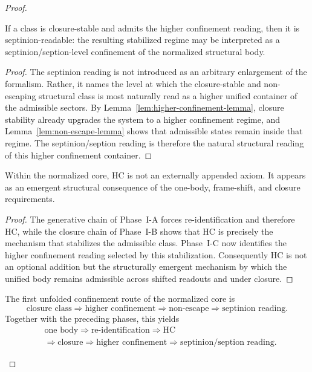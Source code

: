 \begin{proof}
\begin{theorem}
\label{thm:septinion-readability-theorem}
If a class is closure-stable and admits the higher confinement reading, then it
is septinion-readable: the resulting stabilized regime may be interpreted as a
septinion/seption-level confinement of the normalized structural body.
\end{theorem}

\begin{proof}
The septinion reading is not introduced as an arbitrary enlargement of the
formalism. Rather, it names the level at which the closure-stable and
non-escaping structural class is most naturally read as a higher unified
container of the admissible sectors. By Lemma~\ref{lem:higher-confinement-lemma},
closure stability already upgrades the system to a higher confinement regime,
and Lemma~\ref{lem:non-escape-lemma} shows that admissible states remain inside
that regime. The septinion/seption reading is therefore the natural structural
reading of this higher confinement container.
\end{proof}

\begin{corollary}
\label{cor:hc-emergent-structural-consequence}
Within the normalized core, HC is not an externally appended axiom. It appears
as an emergent structural consequence of the one-body, frame-shift, and closure
requirements.
\end{corollary}

\begin{proof}
The generative chain of Phase~I-A forces re-identification and therefore HC,
while the closure chain of Phase~I-B shows that HC is precisely the mechanism
that stabilizes the admissible class. Phase~I-C now identifies the higher
confinement reading selected by this stabilization. Consequently HC is not an
optional addition but the structurally emergent mechanism by which the unified
body remains admissible across shifted readouts and under closure.
\end{proof}

\begin{corollary}
\label{cor:first-confinement-forcing-chain}
The first unfolded confinement route of the normalized core is
\[
\text{closure class}
\Longrightarrow
\text{higher confinement}
\Longrightarrow
\text{non-escape}
\Longrightarrow
\text{septinion reading}.
\]
Together with the preceding phases, this yields
\[
\begin{aligned}
&\text{one body} \Longrightarrow \text{re-identification} \Longrightarrow \mathrm{HC}\\
&\Longrightarrow \text{closure} \Longrightarrow \text{higher confinement} \Longrightarrow \text{septinion/seption reading}.
\end{aligned}
\]
\end{corollary}


\end{proof}
